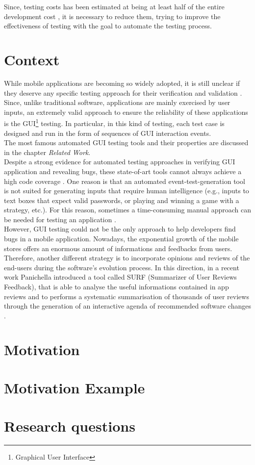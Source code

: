 Since, testing costs has been estimated at being at least half of the entire development cost \cite{Beizer:1990:STT:79060}, it is necessary to reduce them, trying to improve the effectiveness of testing with the goal to automate the testing process.
\section{Context}




While mobile applications are becoming so widely adopted, it is still unclear if they deserve any specific testing approach for their verification and validation \cite{Amalfitano2013}.\\
Since, unlike traditional software, applications are mainly exercised by user inputs, an extremely valid approach to ensure the reliability of these applications is the GUI\footnote{Graphical User Interface} testing. In particular, in this kind of testing, each test case is designed and run in the form of sequences of GUI interaction events. \\
The most famous automated GUI testing tools and their properties are discussed in the chapter \textit{Related Work}. \\
Despite a strong evidence for automated testing approaches in verifying GUI application and revealing bugs, these state-of-art tools cannot always achieve a high code coverage \cite{Nagappan2015}. One reason is that an automated event-test-generation tool is not suited for generating inputs that require human intelligence (e.g., inputs to text boxes that expect valid passwords, or playing and winning a game with a strategy, etc.).
For this reason, sometimes a time-consuming manual approach can be needed for testing an application \cite{Nagappan2015}. \\
However, GUI testing could not be the only approach to help developers find bugs in a mobile application. Nowadays, the exponential growth of the mobile stores offers an enormous amount of informations and feedbacks from users. Therefore, another different strategy is to incorporate opinions and reviews of the end-users during the software's evolution process. \newline
In this direction, in a recent work Panichella \etal introduced a tool called SURF (Summarizer of User Reviews Feedback), that is able to analyse the useful informations contained in app reviews and to performs a systematic summarisation of thousands of user reviews through the generation of an interactive agenda of recommended software changes \cite{DBLP:conf/sigsoft/SorboPASVCG16}.

\section{Motivation}
\section{Motivation Example}
\section{Research questions}